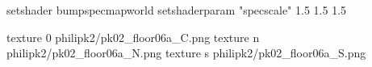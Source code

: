 setshader bumpspecmapworld
setshaderparam "specscale" 1.5 1.5 1.5

texture 0 philipk2/pk02_floor06a_C.png
texture n philipk2/pk02_floor06a_N.png
texture s philipk2/pk02_floor06a_S.png

